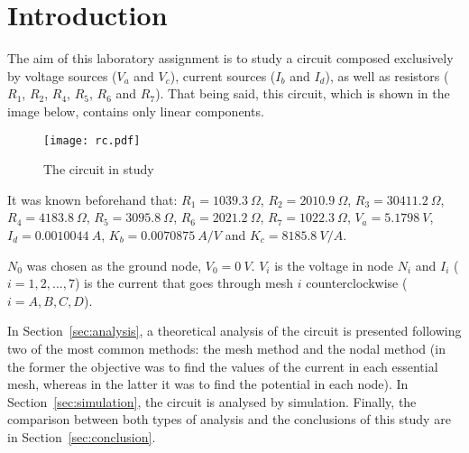 \section{Introduction}
\label{sec:introduction}

\par
The aim of this laboratory assignment is to study a circuit composed exclusively by voltage sources ($V_a$ and $V_c$), current sources ($I_b$ and $I_d$), as well as resistors ($R_1$, $R_2$, $R_4$, $R_5$, $R_6$ and $R_7$). That being said, this circuit, which is shown in the image below, contains only linear components.

\begin{figure}[h] \centering
\texttt{[image: rc.pdf]}
\caption{The circuit in study}
\label{fig:rc}
\end{figure}

\par
It was known beforehand that:
$R_1 = 1039.3 \ \Omega$,
$R_2 = 2010.9 \ \Omega$,
$R_3 = 30411.2 \ \Omega$,
$R_4 = 4183.8 \ \Omega$,
$R_5 = 3095.8 \ \Omega$,
$R_6 = 2021.2 \ \Omega$,
$R_7 = 1022.3 \ \Omega$,
$V_a = 5.1798 \ V$,
$I_d = 0.0010044 \ A$,
$K_b = 0.0070875 \ A/V$ and
$K_c = 8185.8 \ V/A$.


\par
$N_0$ was chosen as the ground node, $V_0 = 0 \ V$. $V_i$ is the voltage in node $N_i$ and $I_i$ ($i=1, 2, ..., 7$) is the current that goes through mesh $i$ counterclockwise ($i=A, B, C, D$).

\par
In Section~\ref{sec:analysis}, a theoretical analysis of the circuit is presented following two of the most common methods: the mesh method and the nodal method (in the former the objective was to find the values of the current in each essential mesh, whereas in the latter it was to find the potential in each node). In Section~\ref{sec:simulation}, the circuit is analysed by simulation. Finally, the  comparison between both types of analysis and the conclusions of this study are in Section~\ref{sec:conclusion}.

